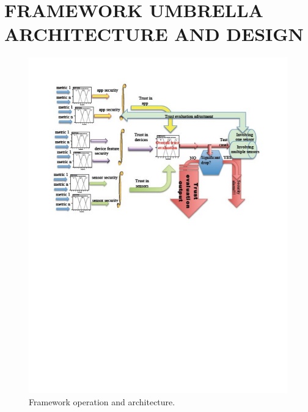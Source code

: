 \section{FRAMEWORK UMBRELLA ARCHITECTURE AND DESIGN}

\begin{figure}[t]
\centering
\includegraphics[width=7.0in]{umbrella_framework.pdf}
\caption{Framework operation and architecture.}
\label{fig:umbrella}
\end{figure}

